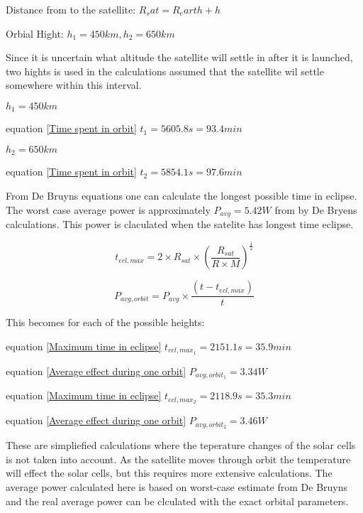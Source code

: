Distance from to the satellite: $R_sat = R_earth + h$

Orbial Hight: $h_1 = 450km, h_2=650km $

\vspace{5 mm}Since it is uncertain what altitude the satellite will settle in after it is launched, two hights is used in the calculations assumed that the satellite wil settle somewhere within this interval.

\vspace{5 mm}$h_1 = 450km$

equation \ref{Time spent in orbit} 
$t_1 = 5605.8 s = 93.4 min$

\vspace{5 mm}$h_2 = 650km$

equation \ref{Time spent in orbit} $t_2 = 5854.1 s = 97.6 min$

\vspace{5 mm}From De Bruyns equations \cite{Satellite Power Systems} one can calculate the longest possible time in eclipse. The worst case average power is approximately $P_{avg} = 5.42 W$ from by De Bryens calculations. This power is claculated when the satelite has longest time eclipse.

\begin{equation}t_{ecl,max} = 2\times R_{sat}\times(\frac{R_{sat}}{R\times M})^{\frac{1}{2}}
\label{Maximum time in eclipse}
\end{equation}

\begin{equation}P_{avg,orbit} = P_{avg}\times\frac{(t-t_{ecl,max})}{t}
\label{Average effect during one orbit}
\end{equation}

\vspace{5 mm}This becomes for each of the possible heights:

equation \ref{Maximum time in eclipse}
$t_{ecl,max_1} = 2151.1 s = 35.9 min$

equation \ref{Average effect during one orbit}
$P_{avg,orbit_1} = 3.34W$

equation \ref{Maximum time in eclipse}
$t_{ecl,max_2} = 2118.9 s = 35.3 min$

equation \ref{Average effect during one orbit}
$P_{avg,orbit_2} = 3.46W$

\vspace{5 mm}These are simpliefied calculations where the teperature changes of the solar cells is not taken into account. As the satellite moves through orbit the temperature will effect the solar cells, but this requires more extensive calculations. The average power calculated here is based on worst-case estimate from De Bruyns \cite{Satellite Power Systems} and the real average power can be clculated with the exact orbital parameters. 

